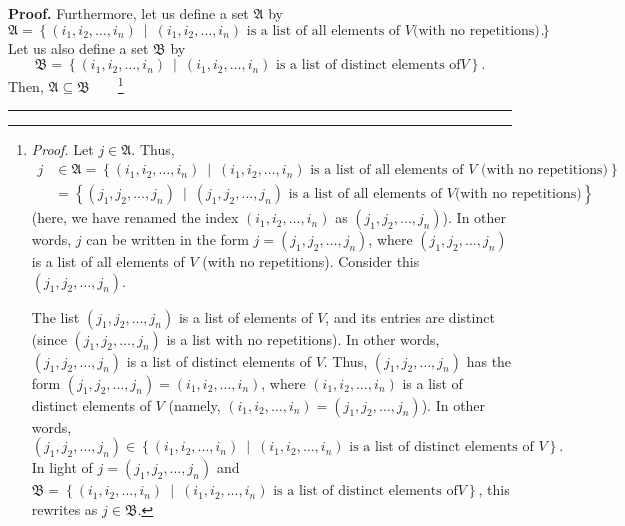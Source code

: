 \documentclass[numbers=enddot,12pt,final,onecolumn,notitlepage]{scrartcl}%
\theoremstyle{definition}
\newenvironment{proof}[1][Proof]{\noindent\textbf{#1.} }{\ \rule{0.5em}{0.5em}}
\newenvironment{verlong}{}{}
\begin{document}
\begin{verlong}
\begin{proof}
Furthermore, let us define a set $\mathfrak{A}$ by%
\[
\mathfrak{A}=\left\{  \left(  i_{1},i_{2},\ldots,i_{n}\right)  \ \mid\ \left(
i_{1},i_{2},\ldots,i_{n}\right)  \text{ is a list of all elements of }V\text{
(with no repetitions)}\right\}  .
\]
Let us also define a set $\mathfrak{B}$ by%
\[
\mathfrak{B}=\left\{  \left(  i_{1},i_{2},\ldots,i_{n}\right)  \ \mid\ \left(
i_{1},i_{2},\ldots,i_{n}\right)  \text{ is a list of distinct elements of
}V\right\}  .
\]
Then, $\mathfrak{A}\subseteq\mathfrak{B}$\ \ \ \ \footnote{\textit{Proof.} Let
$j\in\mathfrak{A}$. Thus,
\begin{align*}
j  &  \in\mathfrak{A}=\left\{  \left(  i_{1},i_{2},\ldots,i_{n}\right)
\ \mid\ \left(  i_{1},i_{2},\ldots,i_{n}\right)  \text{ is a list of all
elements of }V\text{ (with no repetitions)}\right\} \\
&  =\left\{  \left(  j_{1},j_{2},\ldots,j_{n}\right)  \ \mid\ \left(
j_{1},j_{2},\ldots,j_{n}\right)  \text{ is a list of all elements of }V\text{
(with no repetitions)}\right\}
\end{align*}
(here, we have renamed the index $\left(  i_{1},i_{2},\ldots,i_{n}\right)  $
as $\left(  j_{1},j_{2},\ldots,j_{n}\right)  $). In other words, $j$ can be
written in the form $j=\left(  j_{1},j_{2},\ldots,j_{n}\right)  $, where
$\left(  j_{1},j_{2},\ldots,j_{n}\right)  $ is a list of all elements of $V$
(with no repetitions). Consider this $\left(  j_{1},j_{2},\ldots,j_{n}\right)
$.
\par
The list $\left(  j_{1},j_{2},\ldots,j_{n}\right)  $ is a list of elements of
$V$, and its entries are distinct (since $\left(  j_{1},j_{2},\ldots
,j_{n}\right)  $ is a list with no repetitions). In other words, $\left(
j_{1},j_{2},\ldots,j_{n}\right)  $ is a list of distinct elements of $V$.
Thus, $\left(  j_{1},j_{2},\ldots,j_{n}\right)  $ has the form $\left(
j_{1},j_{2},\ldots,j_{n}\right)  =\left(  i_{1},i_{2},\ldots,i_{n}\right)  $,
where $\left(  i_{1},i_{2},\ldots,i_{n}\right)  $ is a list of distinct
elements of $V$ (namely, $\left(  i_{1},i_{2},\ldots,i_{n}\right)  =\left(
j_{1},j_{2},\ldots,j_{n}\right)  $). In other words,%
\[
\left(  j_{1},j_{2},\ldots,j_{n}\right)  \in\left\{  \left(  i_{1}%
,i_{2},\ldots,i_{n}\right)  \ \mid\ \left(  i_{1},i_{2},\ldots,i_{n}\right)
\text{ is a list of distinct elements of }V\right\}  .
\]
In light of $j=\left(  j_{1},j_{2},\ldots,j_{n}\right)  $ and $\mathfrak{B}%
=\left\{  \left(  i_{1},i_{2},\ldots,i_{n}\right)  \ \mid\ \left(  i_{1}%
,i_{2},\ldots,i_{n}\right)  \text{ is a list of distinct elements of
}V\right\}  $, this rewrites as $j\in\mathfrak{B}$.
}
\end{proof}
\end{verlong}
\end{document}
